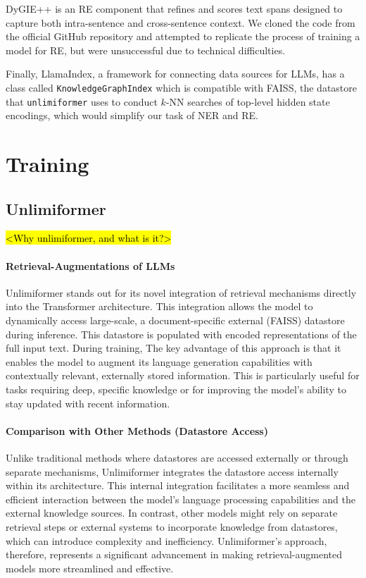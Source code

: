 \documentclass[12pt]{article}
\begin{document}
DyGIE++ \cite{wadden2019dygiepp} is an RE component that refines and scores text spans designed to capture both intra-sentence and cross-sentence context. We cloned the code from the official GitHub repository and attempted to replicate the process of training a model for RE, but were unsuccessful due to technical difficulties.


Finally, LlamaIndex, a framework for connecting data sources for LLMs, has a class called \texttt{KnowledgeGraphIndex} which is compatible with FAISS, the datastore that \texttt{unlimiformer} uses to conduct $k$-NN searches of top-level hidden state encodings, which would simplify our task of NER and RE.


\section{Training}


\subsection*{Unlimiformer}
\hl{<Why unlimiformer, and what is it?>}
\paragraph{Retrieval-Augmentations of LLMs} Unlimiformer stands out for its novel integration of retrieval mechanisms directly into the Transformer architecture. This integration allows the model to dynamically access large-scale, a document-specific external
(FAISS) datastore during inference. This datastore is populated with
encoded representations of the full input text. During training,  The key advantage of this
approach is that it enables the model to augment its language generation
capabilities with contextually relevant, externally stored information. This is
particularly useful for tasks requiring deep, specific knowledge or for
improving the model's ability to stay updated with recent information.


\paragraph{Comparison with Other Methods (Datastore Access)} Unlike traditional
methods where datastores are accessed externally or through separate
mechanisms, Unlimiformer integrates the datastore access internally within its
architecture. This internal integration facilitates a more seamless and
efficient interaction between the model's language processing capabilities and
the external knowledge sources. In contrast, other models might rely on
separate retrieval steps or external systems to incorporate knowledge from
datastores, which can introduce complexity and inefficiency. Unlimiformer's
approach, therefore, represents a significant advancement in making
retrieval-augmented models more streamlined and effective.
\end{document}

